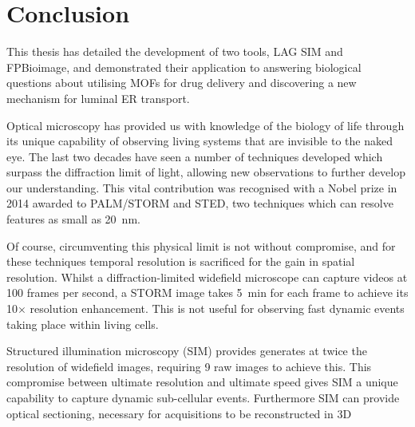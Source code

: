 \chapter{Conclusion}
\label{chap:conclusion}


\ifpdf
    \graphicspath{{Chapter6/Figs/Raster/}{Chapter6/Figs/PDF/}{Chapter6/Figs/}}
\else
    \graphicspath{{Chapter6/Figs/Vector/}{Chapter6/Figs/}}
\fi

This thesis has detailed the development of two tools, LAG SIM and FPBioimage, and demonstrated their application to answering biological questions about utilising MOFs for drug delivery and discovering a new mechanism for luminal ER transport. 

Optical microscopy has provided us with knowledge of the biology of life through its unique capability of observing living systems that are invisible to the naked eye. 
The last two decades have seen a number of techniques developed which surpass the diffraction limit of light, allowing new observations to further develop our understanding. 
This vital contribution was recognised with a Nobel prize in 2014 awarded to PALM/STORM and STED, two techniques which can resolve features as small as \SI{20}{\nano\metre}. 

Of course, circumventing this physical limit is not without compromise, and for these techniques temporal resolution is sacrificed for the gain in spatial resolution. 
Whilst a diffraction-limited widefield microscope can capture videos at 100 frames per second, a STORM image takes \SI{5}{\minute} for each frame to achieve its 10$\times$ resolution enhancement. 
This is not useful for observing fast dynamic events taking place within living cells. 

Structured illumination microscopy (SIM) provides generates at twice the resolution of widefield images, requiring 9 raw images to achieve this. 
This compromise between ultimate resolution and ultimate speed gives SIM a unique capability to capture dynamic sub-cellular events. 
Furthermore SIM can provide optical sectioning, necessary for acquisitions to be reconstructed in 3D 

